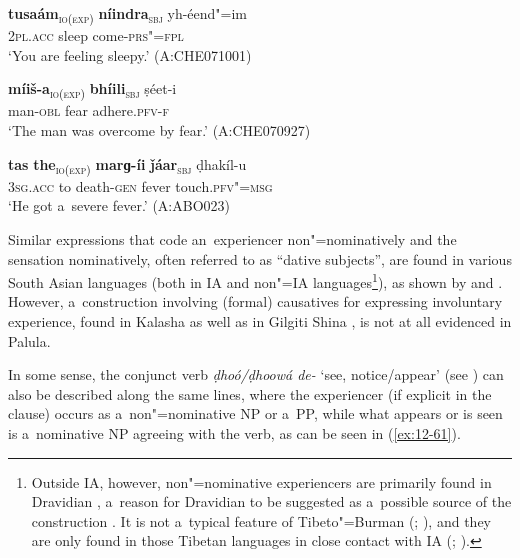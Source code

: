 \begin{exe}
\ex
\label{ex:12-58}
\gll {\ob}\textbf{tusaám}{\cb}\textsubscript{\textsc{\upshape io(exp)}} {\ob}\textbf{níindra}{\cb}\textsubscript{\textsc{\upshape sbj}} yh-éend"=im \\
\textsc{2pl.acc} sleep come-\textsc{prs"=fpl} \\
\glt `You are feeling sleepy.' (A:CHE071001)

\ex
\label{ex:12-59}
\gll {\ob}\textbf{míiš-a}{\cb}\textsubscript{\textsc{\upshape io(exp)}} {\ob}\textbf{bhíili}{\cb}\textsubscript{\textsc{\upshape sbj}}
ṣéet-i \\
man-\textsc{obl} fear adhere.\textsc{pfv-f} \\
\glt `The man was overcome by fear.' (A:CHE070927)

\ex
\label{ex:12-60}
\gll {\ob}\textbf{tas} \textbf{the}{\cb}\textsubscript{\textsc{\upshape io(exp)}} {\ob}\textbf{marɡ-íi} \textbf{ǰáar}{\cb}\textsubscript{\textsc{\upshape sbj}} ḍhakíl-u \\
3\textsc{sg.acc} to death-\textsc{gen} fever touch.\textsc{pfv"=msg} \\
\glt `He got a~severe fever.' (A:ABO023)
\end{exe}

Similar expressions that code an~experiencer non"=nominatively and the sensation nominatively, often referred to as ``dative subjects'', are found in various South Asian languages (both in IA and non"=IA languages\footnote{Outside IA, however, non"=nominative experiencers are primarily found in Dravidian \citep[260--263]{abbi1990}, a~reason for Dravidian to be suggested as a~possible source of the construction \citep[136]{hock1990}. It is not a~typical feature of Tibeto"=Burman (\citealt[260]{abbi1990}; \citealt[82]{bickel2004}), and they are only found in those Tibetan languages in close contact with IA (\citealt[83, 88]{bickel2004}; \citealt[8--9]{noonan2003}).}), as shown by \citet[326--330]{hook1990b} and \citet[256--263]{abbi1990}. However, a~construction involving (formal) causatives for expressing involuntary experience, found in Kalasha \citep[310]{bashir1990} as well as in Gilgiti Shina \citep{hookzia2005}, is not at all evidenced in Palula. 



In some sense, the conjunct verb \textit{ḍhoó/ḍhoowá de-} `see, notice/appear' (see ) can also be described along the same lines, where the experiencer (if explicit in the clause) occurs as a~non"=nominative NP or a~PP, while what appears or is seen is a~nominative NP agreeing with the verb, as can be seen in (\ref{ex:12-61}).

